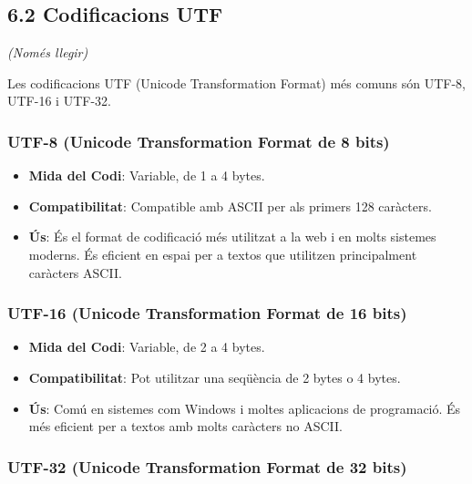 \documentclass[
  12 pt,
  a4paper,
]{article}
\providecommand{\tightlist}{%
  \setlength{\itemsep}{0pt}\setlength{\parskip}{0pt}}
\begin{document}
\subsection{6.2 Codificacions UTF}\label{codificacions-utf}

\emph{(Només llegir)}

Les codificacions UTF (Unicode Transformation Format) més comuns són
UTF-8, UTF-16 i UTF-32.

\subsubsection{UTF-8 (Unicode Transformation Format de 8
bits)}\label{utf-8-unicode-transformation-format-de-8-bits}

\begin{itemize}
\tightlist
\item
  \textbf{Mida del Codi}: Variable, de 1 a 4 bytes.
\item
  \textbf{Compatibilitat}: Compatible amb ASCII per als primers 128
  caràcters.
\item
  \textbf{Ús}: És el format de codificació més utilitzat a la web i en
  molts sistemes moderns. És eficient en espai per a textos que
  utilitzen principalment caràcters ASCII.
\end{itemize}

\subsubsection{UTF-16 (Unicode Transformation Format de 16
bits)}\label{utf-16-unicode-transformation-format-de-16-bits}

\begin{itemize}
\tightlist
\item
  \textbf{Mida del Codi}: Variable, de 2 a 4 bytes.
\item
  \textbf{Compatibilitat}: Pot utilitzar una seqüència de 2 bytes o 4
  bytes.
\item
  \textbf{Ús}: Comú en sistemes com Windows i moltes aplicacions de
  programació. És més eficient per a textos amb molts caràcters no
  ASCII.
\end{itemize}

\subsubsection{UTF-32 (Unicode Transformation Format de 32
bits)}\label{utf-32-unicode-transformation-format-de-32-bits}
\end{document}
